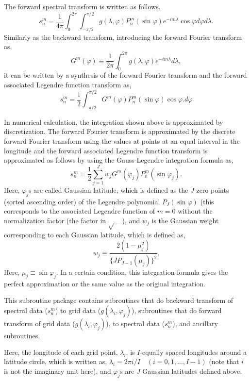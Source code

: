 \documentclass[a4paper]{scrartcl}
\begin{document}
The forward spectral transform is written as follows.
\begin{equation}
s^m_n=\frac1{4\pi}\int^{2\pi}_0\int^{\pi/2}_{-\pi/2}
g(\lambda,\varphi)P^m_n(\sin\varphi)e^{-im\lambda}\cos\varphi d\varphi
d\lambda .
\end{equation}
Similarly as the backward transform, introducing the forward
Fourier transform as,
\begin{equation}
G^m(\varphi)\equiv\frac1{2\pi}\int^{2\pi}_0
g(\lambda,\varphi)e^{-im\lambda}d\lambda,
\end{equation}
it can be written by a synthesis of 
the forward Fourier transform and the forward 
associated Legendre function transform as,
\begin{equation}
s^m_n=\frac12\int^{\pi/2}_{-\pi/2}G^m(\varphi)P^m_n(\sin\varphi)\cos\varphi.
d\varphi
\end{equation}

In numerical calculation, the integration shown above is approximated
by discretization. The forward Fourier transform is approximated
by the discrete forward Fourier transform using the values at
points at an equal interval in the longitude and the forward 
associated Legendre function 
transform is approximated as follows by using the Gauss-Legendre
integration formula as,
\begin{equation}
s^m_n=\frac12\sum^J_{j=1}w_jG^m(\varphi_j)P^m_n(\sin\varphi_j).
\end{equation}
Here, $\varphi_j$s are called Gaussian latitude, which is defined as
the $J$ zero points (sorted ascending order) of the Legendre
polynomial $P_J(\sin\varphi)$ (this corresponds to 
the associated Legendre function of $m=0$ without the normalization
factor (the factor in $\sqrt{\quad}$), and $w_j$ is 
the Gaussian weight corresponding to each Gaussian latitude, 
which is defined as,
\begin{equation}
w_j\equiv\frac{2(1-\mu_j^2)}{\{JP_{J-1}(\mu_j)\}^2}.
\end{equation}
Here, $\mu_j\equiv\sin\varphi_j$.
In a certain condition, this integration formula gives the 
perfect approximation or the same value as the original integration.

This subroutine package contains
subroutines that do backward transform of spectral data ($s^m_n$) 
to grid data ($g(\lambda_i,\varphi_j)$),
subroutines that do forward transform of
grid data ($g(\lambda_i,\varphi_j)$),
to spectral data ($s^m_n$), and ancillary subroutines.

Here, the longitude of each grid point, $\lambda_i$, 
is $I$-equally spaced longitudes around a latitude circle,
which is written as,
$\lambda_i=2\pi i/I\quad (i=0,1,\ldots,I-1)$
(note that $i$ is not the imaginary unit here),
and $\varphi_j$s are $J$ Gaussian latitudes defined above.
\end{document}
